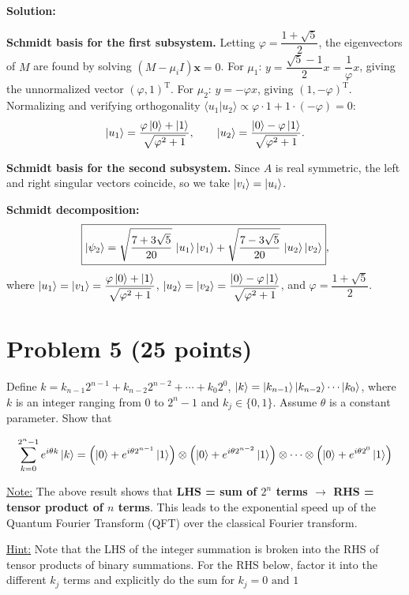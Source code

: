 \documentclass[11pt]{article}
\newenvironment{solution}
{\par\noindent\textbf{Solution:}\par}
{\vspace{1em}}
\begin{document}
\begin{solution}
\textbf{Schmidt basis for the first subsystem.} Letting $\varphi=\dfrac{1+\sqrt5}{2}$, the eigenvectors of $M$ are found by solving $(M-\mu_i I)\mathbf{x}=0$. For $\mu_1$: $y=\dfrac{\sqrt5-1}{2}x=\dfrac{1}{\varphi}x$, giving the unnormalized vector $(\varphi,1)^{\mathrm{T}}$. For $\mu_2$: $y=-\varphi x$, giving $(1,-\varphi)^{\mathrm{T}}$. Normalizing and verifying orthogonality $\langle u_1|u_2\rangle\propto\varphi\cdot1+1\cdot(-\varphi)=0$:
\[
\ket{u_1}=\frac{\varphi\ket0+\ket1}{\sqrt{\varphi^2+1}},
\qquad
\ket{u_2}=\frac{\ket0-\varphi\ket1}{\sqrt{\varphi^2+1}}.
\]

\textbf{Schmidt basis for the second subsystem.} Since $A$ is real symmetric, the left and right singular vectors coincide, so we take $\ket{v_i}=\ket{u_i}$.

\textbf{Schmidt decomposition:}
\[
\boxed{\ket{\psi_2}=\sqrt{\frac{7+3\sqrt5}{20}}\,\ket{u_1}\ket{v_1}+\sqrt{\frac{7-3\sqrt5}{20}}\,\ket{u_2}\ket{v_2}},
\]
where $\ket{u_1}=\ket{v_1}=\dfrac{\varphi\ket0+\ket1}{\sqrt{\varphi^2+1}}$, $\ket{u_2}=\ket{v_2}=\dfrac{\ket0-\varphi\ket1}{\sqrt{\varphi^2+1}}$, and $\varphi=\dfrac{1+\sqrt5}{2}$.

\end{solution}

\section*{Problem 5 (25 points)}
Define \(k = k_{n-1}2^{n-1} + k_{n-2}2^{n-2} + \cdots + k_0 2^0\), \(\ket{k} = \ket{k_{n-1}}\ket{k_{n-2}}\cdots\ket{k_0}\), where \(k\) is an integer ranging from 0 to \(2^n-1\) and \(k_j \in \{0,1\}\). Assume \(\theta\) is a constant parameter. Show that

\[\sum_{k=0}^{2^n-1} e^{i\theta k}\ket{k} = \left(\ket{0} + e^{i\theta 2^{n-1}}\ket{1}\right) \otimes \left(\ket{0} + e^{i\theta 2^{n-2}}\ket{1}\right) \otimes \cdots \otimes \left(\ket{0} + e^{i\theta 2^0}\ket{1}\right)\]

\underline{Note:} The above result shows that \textbf{LHS = sum of \(2^n\) terms \(\boldsymbol{\rightarrow}\) RHS = tensor product of \(\textit{n}\) terms}. This leads to the exponential speed up of the Quantum Fourier Transform (QFT) over the classical Fourier transform.

\underline{Hint:} Note that the LHS of the integer summation is broken into the RHS of tensor products of binary summations. For the RHS below, factor it into the different \(k_j\) terms and explicitly do the sum for \(k_j = 0 \text{ and } 1\)
\end{document}
